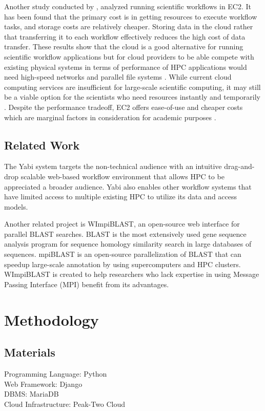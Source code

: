 \documentclass[journal]{./IEEE/IEEEtran}
\begin{document}
         Another study conducted by \cite{SciWorkflowEC2}, analyzed running scientific workflows in EC2. It has been found that the primary cost is in getting resources to execute workflow tasks, and storage costs are relatively cheaper. Storing data in the cloud rather that transferring it to each workflow effectively reduces the high cost of data transfer. These results show that the cloud is a good alternative for running scientific workflow applications but for cloud providers to be able compete with existing physical systems in terms of performance of HPC applications would need high-speed networks and parallel file systems \cite{SciWorkflowEC2}\cite{WalkerEC2HPC}. While current cloud computing services are insufficient for large-scale scientific computing, it may still be a viable option for the scientists who need resources instantly and temporarily \cite{PerfAnalysisManyTasks}. Despite the performance tradeoff, EC2 offers ease-of-use and cheaper costs which are marginal factors in consideration for academic purposes \cite{ZachHumphrey}.
    \subsection {Related Work}
        The Yabi system \cite{7411021620120101} targets the non-technical audience with an intuitive drag-and-drop scalable web-based workflow environment that allows HPC to be appreciated a broader audience. Yabi also enables other workflow systems that have limited access to multiple existing HPC to utilize its data and access models.
        
	Another related project is WImpiBLAST\cite{9686120720140601}, an open-source web interface for parallel BLAST searches. BLAST is the most extensively used gene sequence analysis program for sequence homology similarity search in large databases of sequences. mpiBLAST is an open-source parallelization of BLAST that can speedup large-scale annotation by using supercomputers and HPC clusters. WImpiBLAST is created to help researchers who lack expertise in using Message Passing Interface (MPI) benefit from its advantages.     
        
        
\section{Methodology}
   \subsection {Materials}
    \begin{description}
      \item[Programming Language: Python ]
      \item[Web Framework: Django ]
      \item[DBMS: MariaDB]
      \item[Cloud Infrastructure: Peak-Two Cloud ]
    \end{description}
\end{document}
